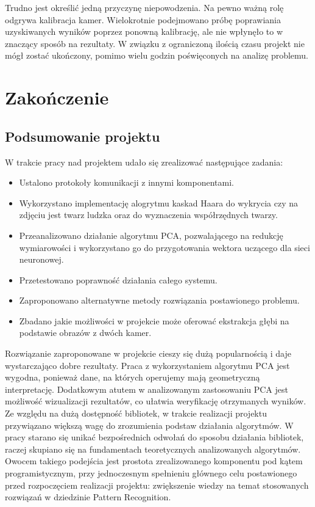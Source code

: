 \documentclass[oneside, eng]{mgr}
\begin{document}
Trudno jest określić jedną przyczynę niepowodzenia. Na pewno ważną rolę odgrywa kalibracja kamer. Wielokrotnie podejmowano próbę poprawiania uzyskiwanych wyników poprzez ponowną kalibrację, ale nie wpłynęło to w znaczący sposób na rezultaty. W związku z ograniczoną ilością czasu projekt nie mógł zostać ukończony, pomimo wielu godzin poświęconych na analizę problemu.



\chapter{Zakończenie}

\section{Podsumowanie projektu}

W trakcie pracy nad projektem udało się zrealizować następujące zadania:
\begin{itemize}

\item Ustalono protokoły komunikacji z innymi komponentami.

\item Wykorzystano implementację alogrytmu kaskad Haara do wykrycia czy na zdjęciu jest twarz ludzka oraz do wyznaczenia współrzędnych twarzy.

\item Przeanalizowano działanie algorytmu PCA, pozwalającego na redukcję wymiarowości i wykorzystano go do przygotowania wektora uczącego dla sieci neuronowej.

\item Przetestowano poprawność działania całego systemu.

\item Zaproponowano alternatywne metody rozwiązania postawionego problemu.

\item Zbadano jakie możliwości w projekcie może oferować ekstrakcja głębi na podstawie obrazów z dwóch kamer.

\end{itemize}

Rozwiązanie zaproponowane w projekcie cieszy się dużą popularnością i daje wystarczająco dobre rezultaty. Praca z wykorzystaniem algorytmu PCA jest wygodna, ponieważ dane, na których operujemy mają geometryczną interpretację. Dodatkowym atutem w analizowanym zastosowaniu PCA jest możliwość wizualizacji rezultatów, co ułatwia weryfikację otrzymanych wyników. Ze względu na dużą dostępność bibliotek, w trakcie realizacji projektu przywiązano większą wagę do zrozumienia podstaw działania algorytmów. W pracy starano się unikać bezpośrednich odwołań do sposobu działania bibliotek, raczej skupiano się na fundamentach teoretycznych analizowanych algorytmów. Owocem takiego podejścia jest prostota zrealizowanego komponentu pod kątem programistycznym, przy jednoczesnym spełnieniu głównego celu postawionego przed rozpoczęciem realizacji projektu: zwiększenie wiedzy na temat stosowanych rozwiązań w dziedzinie Pattern Recognition. 
\end{document}
